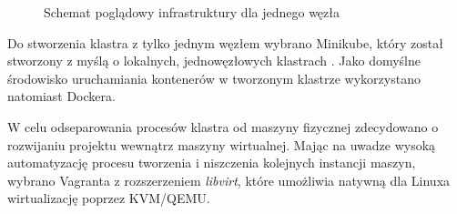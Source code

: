 \begin{figure}[htp]
\caption{Schemat poglądowy infrastruktury dla jednego węzła}
\end{figure}
\newpage

Do stworzenia klastra z tylko jednym węzłem wybrano Minikube, który został stworzony z myślą o lokalnych, jednowęzłowych klastrach \cite{minikube}. Jako domyślne środowisko uruchamiania kontenerów w tworzonym klastrze wykorzystano natomiast Dockera. 

W celu odseparowania procesów klastra od maszyny fizycznej zdecydowano o rozwijaniu projektu wewnątrz maszyny wirtualnej. Mając na uwadze wysoką automatyzację procesu tworzenia i niszczenia kolejnych instancji maszyn, wybrano Vagranta z rozszerzeniem \textit{libvirt}, które umożliwia natywną dla Linuxa wirtualizację poprzez KVM/QEMU.\\

